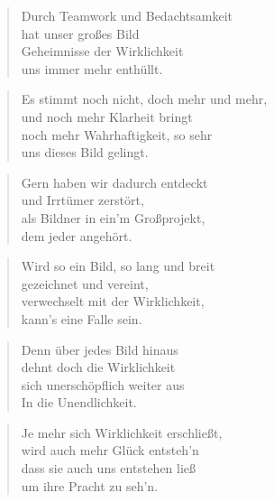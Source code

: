 \documentclass[10pt,a4paper]{article}
\begin{document}
\begin{multicols}{2}
\begin{verse}
Durch Teamwork und Bedachtsamkeit \\
hat unser großes Bild \\
Geheimnisse der Wirklichkeit \\
uns immer mehr enthüllt. \\
\end{verse}

\begin{verse}
Es stimmt noch nicht, doch mehr und mehr, \\
und noch mehr Klarheit bringt \\
noch mehr Wahrhaftigkeit, so sehr \\
uns dieses Bild gelingt. \\
\end{verse}

\begin{verse}
Gern haben wir dadurch entdeckt \\
und Irrtümer zerstört, \\
als Bildner in ein’m Großprojekt, \\
dem jeder angehört. \\
\end{verse}

\begin{verse}
Wird so ein Bild, so lang und breit \\
gezeichnet und vereint, \\
verwechselt mit der Wirklichkeit, \\
kann’s eine Falle sein. \\
\end{verse}

\begin{verse}
Denn über jedes Bild hinaus \\
dehnt doch die Wirklichkeit \\
sich unerschöpflich weiter aus \\
In die Unendlichkeit. \\
\end{verse}

\begin{verse}
Je mehr sich Wirklichkeit erschließt, \\
wird auch mehr Glück entsteh’n \\
dass sie auch uns entstehen ließ \\
um ihre Pracht zu seh’n. \\
\end{verse}


\end{multicols}
\end{document}
